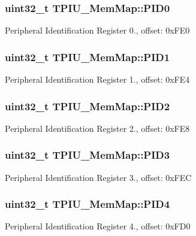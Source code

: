 \subsubsection[{P\+I\+D0}]{\setlength{\rightskip}{0pt plus 5cm}uint32\+\_\+t T\+P\+I\+U\+\_\+\+Mem\+Map\+::\+P\+I\+D0}\label{struct_t_p_i_u___mem_map_a8cf104c851fc40c954ff97ddff1d8d3b}
Peripheral Identification Register 0., offset\+: 0x\+F\+E0 \hypertarget{struct_t_p_i_u___mem_map_a2f7285e167ba972adc7d760671b6cd94}{}
\subsubsection[{P\+I\+D1}]{\setlength{\rightskip}{0pt plus 5cm}uint32\+\_\+t T\+P\+I\+U\+\_\+\+Mem\+Map\+::\+P\+I\+D1}\label{struct_t_p_i_u___mem_map_a2f7285e167ba972adc7d760671b6cd94}
Peripheral Identification Register 1., offset\+: 0x\+F\+E4 \hypertarget{struct_t_p_i_u___mem_map_a9c86b62f691869178b490b1641d83afe}{}
\subsubsection[{P\+I\+D2}]{\setlength{\rightskip}{0pt plus 5cm}uint32\+\_\+t T\+P\+I\+U\+\_\+\+Mem\+Map\+::\+P\+I\+D2}\label{struct_t_p_i_u___mem_map_a9c86b62f691869178b490b1641d83afe}
Peripheral Identification Register 2., offset\+: 0x\+F\+E8 \hypertarget{struct_t_p_i_u___mem_map_abf0fc2738afe793c35be489ddee5c0e0}{}
\subsubsection[{P\+I\+D3}]{\setlength{\rightskip}{0pt plus 5cm}uint32\+\_\+t T\+P\+I\+U\+\_\+\+Mem\+Map\+::\+P\+I\+D3}\label{struct_t_p_i_u___mem_map_abf0fc2738afe793c35be489ddee5c0e0}
Peripheral Identification Register 3., offset\+: 0x\+F\+E\+C \hypertarget{struct_t_p_i_u___mem_map_ad70cfe6551cef4070f3f838a9a66c821}{}
\subsubsection[{P\+I\+D4}]{\setlength{\rightskip}{0pt plus 5cm}uint32\+\_\+t T\+P\+I\+U\+\_\+\+Mem\+Map\+::\+P\+I\+D4}\label{struct_t_p_i_u___mem_map_ad70cfe6551cef4070f3f838a9a66c821}
Peripheral Identification Register 4., offset\+: 0x\+F\+D0 \hypertarget{struct_t_p_i_u___mem_map_a538891793ff7ccfae685d49a0603dc77}{}
